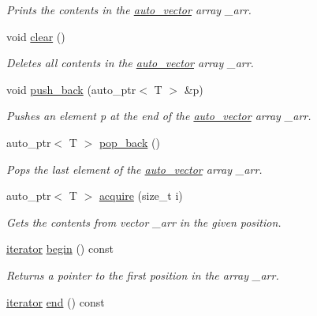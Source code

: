 \begin{DoxyCompactItemize}
\begin{DoxyCompactList}\small\item\em Prints the contents in the \hyperlink{classauto__vector}{auto\-\_\-vector} array \-\_\-arr. \end{DoxyCompactList}\item 
\hypertarget{classauto__vector_a764809bfe8ea1bce8f0bde7c79839ba3}{void \hyperlink{classauto__vector_a764809bfe8ea1bce8f0bde7c79839ba3}{clear} ()}\label{classauto__vector_a764809bfe8ea1bce8f0bde7c79839ba3}

\begin{DoxyCompactList}\small\item\em Deletes all contents in the \hyperlink{classauto__vector}{auto\-\_\-vector} array \-\_\-arr. \end{DoxyCompactList}\item 
void \hyperlink{classauto__vector_a0495393c94517c0a25af3f00f9afb845}{push\-\_\-back} (auto\-\_\-ptr$<$ T $>$ \&p)
\begin{DoxyCompactList}\small\item\em Pushes an element {\itshape p} at the end of the \hyperlink{classauto__vector}{auto\-\_\-vector} array \-\_\-arr. \end{DoxyCompactList}\item 
auto\-\_\-ptr$<$ T $>$ \hyperlink{classauto__vector_a4d6b60c1b38d1c8bbe9c9dc808743f29}{pop\-\_\-back} ()
\begin{DoxyCompactList}\small\item\em Pops the last element of the \hyperlink{classauto__vector}{auto\-\_\-vector} array \-\_\-arr. \end{DoxyCompactList}\item 
auto\-\_\-ptr$<$ T $>$ \hyperlink{classauto__vector_a53de704658c049839e5e75da35b14602}{acquire} (size\-\_\-t i)
\begin{DoxyCompactList}\small\item\em Gets the contents from vector \-\_\-arr in the given position. \end{DoxyCompactList}\item 
\hyperlink{classauto__iterator}{iterator} \hyperlink{classauto__vector_a0690df2f134d5e8318508fe2f00ed7fd}{begin} () const 
\begin{DoxyCompactList}\small\item\em Returns a pointer to the first position in the array \-\_\-arr. \end{DoxyCompactList}\item 
\hyperlink{classauto__iterator}{iterator} \hyperlink{classauto__vector_a266e4fb18cbd0af7d685c97ddf18100d}{end} () const 

\end{DoxyCompactItemize}
